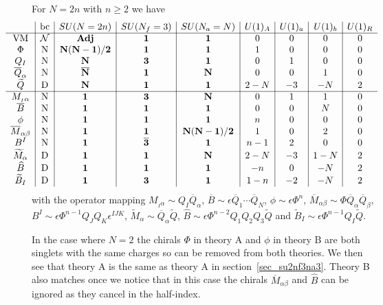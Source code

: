\documentclass[12pt]{article}
\numberwithin{equation}{section}
\begin{document}
For $N = 2n$ with $n \ge 2$ we have
\begin{align}
\hspace*{-1cm}
\label{SUN_even_AS_charges}
\begin{array}{c|c|c|c|c|c|c|c|c}
& \textrm{bc} & SU(N = 2n) & SU(N_f = 3) & SU(N_a = N) & U(1)_A & U(1)_a & U(1)_b & U(1)_R \\ \hline
\textrm{VM} & \mathcal{N} & {\bf Adj} & {\bf 1} & {\bf 1} & 0 & 0 & 0 & 0 \\
\Phi & \textrm{N} & {\bf N(N-1)/2} & {\bf 1} & {\bf 1} & 1 & 0 & 0 & 0 \\
Q_I & \textrm{N} & {\bf N} & {\bf 3} & {\bf 1} & 0 & 1 & 0 & 0 \\
\overline{Q}_{\alpha} & \textrm{N} & {\bf \overline{N}} & {\bf 1} & {\bf N} & 0 & 0 & 1 & 0 \\
\widetilde{Q} & \textrm{D} & {\bf N} & {\bf 1} & {\bf 1} & 2 - N & -3 & -N & 2 \\
 \hline
M_{_I \alpha} & \textrm{N} & {\bf 1} & {\bf 3} & {\bf N} & 0 & 1 & 1 & 0 \\
\overline{B} & \textrm{N} & {\bf 1} & {\bf 1} & {\bf 1} & 0 & 0 & N & 0 \\
\phi & \textrm{N} & {\bf 1} & {\bf 1} & {\bf 1} & n & 0 & 0 & 0 \\
\overline{M}_{\alpha \beta} & \textrm{N} & {\bf 1} & {\bf 1} & {\bf N(N-1)/2} & 1 & 0 & 2 & 0 \\
B^I & \textrm{N} & {\bf 1} & {\bf \overline{3}} & {\bf 1} & n - 1 & 2 & 0 & 0 \\
\widetilde{M}_{\alpha} & \textrm{D} & {\bf 1} & {\bf 1} & {\bf N} & 2 - N & -3 & 1-N & 2 \\
\widehat{B} & \textrm{D} & {\bf 1} & {\bf 1} & {\bf 1} & -n & 0 & -N & 2 \\
\widetilde{B}_I & \textrm{D} & {\bf 1} & {\bf 3} & {\bf 1} & 1 - n & -2 & -N & 2
\end{array}
\end{align}
with the operator mapping $M_{_I \alpha} \sim Q_I \overline{Q}_{\alpha}$, $\overline{B} \sim \epsilon \overline{Q}_1 \cdots \overline{Q}_N$, $\phi \sim \epsilon \Phi^n$, $\overline{M}_{\alpha \beta} \sim \Phi \overline{Q}_{\alpha} \overline{Q}_{\beta}$, $B^I \sim \epsilon \Phi^{n-1} Q_J Q_K \epsilon^{IJK}$, $\widetilde{M}_{\alpha} \sim \overline{Q}_{\alpha} \widetilde{Q}$, $\widehat{B} \sim \epsilon \Phi^{n-2} Q_1 Q_2 Q_3 \widetilde{Q}$ and $\widetilde{B}_I \sim \epsilon \Phi^{n-1} Q_I \widetilde{Q}$. 

In the case where $N = 2$ the chirals $\Phi$ in theory A and $\phi$ in theory B are both singlets with the same charges so can be removed from both theories. We then see that theory A is the same as theory A in section~\ref{sec_su2nf3na3}. Theory B also matches once we notice that in this case the chirals $\overline{M}_{\alpha \beta}$ and $\widehat{B}$ can be ignored as they cancel in the half-index.
\end{document}
